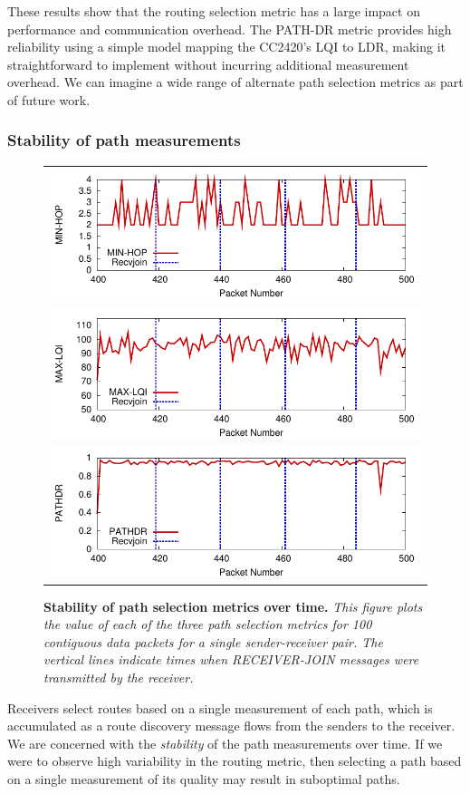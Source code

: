 These results show that the routing selection metric has a
large impact on performance and communication overhead. 
The PATH-DR metric provides high reliability using a simple
model mapping the CC2420's LQI to LDR, making it straightforward
to implement without incurring additional measurement overhead.
We can imagine a wide range of alternate path selection metrics 
as part of future work.

\subsubsection{Stability of path measurements}

\begin{figure}
  \begin{center}
    \begin{tabular}{c}
      \includegraphics[width=0.4\hsize]{resources/tinyadmr-techrept05/figures/lessons/timeline/Tracecosthop.pdf}
      \\
      \includegraphics[width=0.4\hsize]{resources/tinyadmr-techrept05/figures/lessons/timeline/Tracecostlqi.pdf}
      \\
      \includegraphics[width=0.4\hsize]{resources/tinyadmr-techrept05/figures/lessons/timeline/Tracecostdr.pdf}
    \end{tabular}
  \end{center}
  \caption{{\small {\bf Stability of path selection metrics over
  time.} {\em This figure plots the value of each of the three
path selection metrics for 100 contiguous data packets for a
single sender-receiver pair. The vertical lines indicate times when 
RECEIVER-JOIN messages were transmitted by the receiver.}}}
\label{fig-pathcostwithtime}
\end{figure}

Receivers select routes based on a single measurement of each path,
which is accumulated as a route discovery message flows from the
senders to the receiver. 
We are concerned with the {\em stability} of the path
measurements over time. If we were to observe high variability in 
the routing metric, then selecting a path based on a single 
measurement of its quality may result in suboptimal paths.

